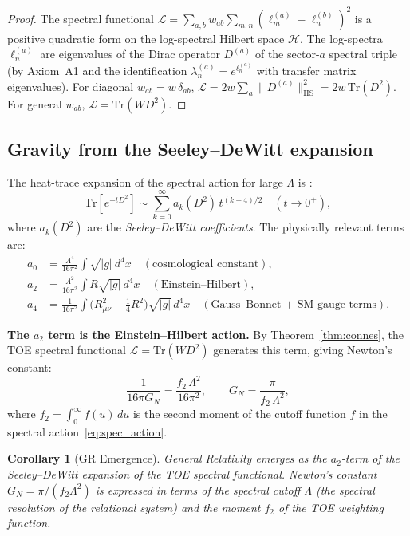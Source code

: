 \documentclass[12pt]{article}
\newtheorem{corollary}[theorem]{Corollary}
\theoremstyle{definition}
\theoremstyle{remark}
\newcommand{\Tr}{\mathrm{Tr}}
\begin{document}
\begin{proof}
The spectral functional $\mathcal{L} = \sum_{a,b} w_{ab}\sum_{m,n}(\ell_m^{(a)}-\ell_n^{(b)})^2$
is a positive quadratic form on the log-spectral Hilbert space $\mathcal{H}$.
The log-spectra $\ell_n^{(a)}$ are eigenvalues of the Dirac operator $D^{(a)}$
of the sector-$a$ spectral triple (by Axiom~A1 and the identification
$\lambda_n^{(a)} = e^{\ell_n^{(a)}}$ with transfer matrix eigenvalues).
For diagonal $w_{ab} = w\,\delta_{ab}$, $\mathcal{L} = 2w\sum_a\|D^{(a)}\|_\mathrm{HS}^2
= 2w\,\Tr(D^2)$.  For general $w_{ab}$, $\mathcal{L} = \Tr(WD^2)$.
\end{proof}

\subsection{Gravity from the Seeley--DeWitt expansion}

The heat-trace expansion of the spectral action for large $\Lambda$
is \cite{Vassilevich2003}:
\begin{equation}\label{eq:seeley}
\Tr[e^{-t D^2}]
\sim \sum_{k=0}^\infty a_k(D^2)\,t^{(k-4)/2}
\quad (t \to 0^+),
\end{equation}
where $a_k(D^2)$ are the \emph{Seeley--DeWitt coefficients}.
The physically relevant terms are:
\begin{align}
a_0 &= \frac{\Lambda^4}{16\pi^2}
       \int \sqrt{|g|}\,d^4x
\quad (\text{cosmological constant}),\label{eq:a0}\\
a_2 &= \frac{\Lambda^2}{16\pi^2}
       \int R\sqrt{|g|}\,d^4x
\quad (\text{Einstein--Hilbert}),\label{eq:a2}\\
a_4 &= \frac{1}{16\pi^2}
       \int \bigl(R_{\mu\nu}^2 - \tfrac{1}{4}R^2\bigr)
       \sqrt{|g|}\,d^4x
\quad (\text{Gauss--Bonnet + SM gauge terms}).\label{eq:a4}
\end{align}

\textbf{The $a_2$ term is the Einstein--Hilbert action.}
By Theorem~\ref{thm:connes}, the TOE spectral functional $\mathcal{L} = \Tr(WD^2)$
generates this term, giving Newton's constant:
\begin{equation}\label{eq:Newton}
\frac{1}{16\pi G_N} = \frac{f_2\,\Lambda^2}{16\pi^2},
\qquad
G_N = \frac{\pi}{f_2\,\Lambda^2},
\end{equation}
where $f_2 = \int_0^\infty f(u)\,du$ is the second moment of the
cutoff function $f$ in the spectral action~\eqref{eq:spec_action}.

\begin{corollary}[GR Emergence]\label{cor:GR}
General Relativity emerges as the $a_2$-term of the Seeley--DeWitt
expansion of the TOE spectral functional.  Newton's constant
$G_N = \pi/(f_2\Lambda^2)$ is expressed in terms of the spectral
cutoff $\Lambda$ (the spectral resolution of the relational system)
and the moment $f_2$ of the TOE weighting function.
\end{corollary}
\end{document}

